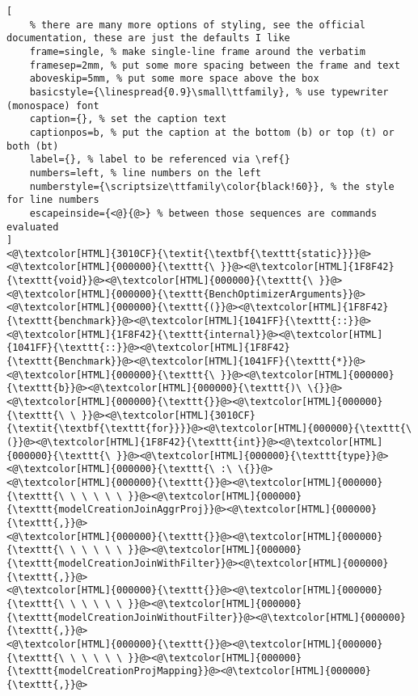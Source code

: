 \begin{lstlisting}[
	% there are many more options of styling, see the official documentation, these are just the defaults I like
	frame=single, % make single-line frame around the verbatim
	framesep=2mm, % put some more spacing between the frame and text
	aboveskip=5mm, % put some more space above the box
	basicstyle={\linespread{0.9}\small\ttfamily}, % use typewriter (monospace) font
	caption={}, % set the caption text
	captionpos=b, % put the caption at the bottom (b) or top (t) or both (bt)
    label={}, % label to be referenced via \ref{}
	numbers=left, % line numbers on the left
	numberstyle={\scriptsize\ttfamily\color{black!60}}, % the style for line numbers
	escapeinside={<@}{@>} % between those sequences are commands evaluated
]
<@\textcolor[HTML]{3010CF}{\textit{\textbf{\texttt{static}}}}@><@\textcolor[HTML]{000000}{\texttt{\ }}@><@\textcolor[HTML]{1F8F42}{\texttt{void}}@><@\textcolor[HTML]{000000}{\texttt{\ }}@><@\textcolor[HTML]{000000}{\texttt{BenchOptimizerArguments}}@><@\textcolor[HTML]{000000}{\texttt{(}}@><@\textcolor[HTML]{1F8F42}{\texttt{benchmark}}@><@\textcolor[HTML]{1041FF}{\texttt{::}}@><@\textcolor[HTML]{1F8F42}{\texttt{internal}}@><@\textcolor[HTML]{1041FF}{\texttt{::}}@><@\textcolor[HTML]{1F8F42}{\texttt{Benchmark}}@><@\textcolor[HTML]{1041FF}{\texttt{*}}@><@\textcolor[HTML]{000000}{\texttt{\ }}@><@\textcolor[HTML]{000000}{\texttt{b}}@><@\textcolor[HTML]{000000}{\texttt{)\ \{}}@>
<@\textcolor[HTML]{000000}{\texttt{}}@><@\textcolor[HTML]{000000}{\texttt{\ \ }}@><@\textcolor[HTML]{3010CF}{\textit{\textbf{\texttt{for}}}}@><@\textcolor[HTML]{000000}{\texttt{\ (}}@><@\textcolor[HTML]{1F8F42}{\texttt{int}}@><@\textcolor[HTML]{000000}{\texttt{\ }}@><@\textcolor[HTML]{000000}{\texttt{type}}@><@\textcolor[HTML]{000000}{\texttt{\ :\ \{}}@>
<@\textcolor[HTML]{000000}{\texttt{}}@><@\textcolor[HTML]{000000}{\texttt{\ \ \ \ \ \ }}@><@\textcolor[HTML]{000000}{\texttt{modelCreationJoinAggrProj}}@><@\textcolor[HTML]{000000}{\texttt{,}}@>
<@\textcolor[HTML]{000000}{\texttt{}}@><@\textcolor[HTML]{000000}{\texttt{\ \ \ \ \ \ }}@><@\textcolor[HTML]{000000}{\texttt{modelCreationJoinWithFilter}}@><@\textcolor[HTML]{000000}{\texttt{,}}@>
<@\textcolor[HTML]{000000}{\texttt{}}@><@\textcolor[HTML]{000000}{\texttt{\ \ \ \ \ \ }}@><@\textcolor[HTML]{000000}{\texttt{modelCreationJoinWithoutFilter}}@><@\textcolor[HTML]{000000}{\texttt{,}}@>
<@\textcolor[HTML]{000000}{\texttt{}}@><@\textcolor[HTML]{000000}{\texttt{\ \ \ \ \ \ }}@><@\textcolor[HTML]{000000}{\texttt{modelCreationProjMapping}}@><@\textcolor[HTML]{000000}{\texttt{,}}@>

\end{lstlisting}
